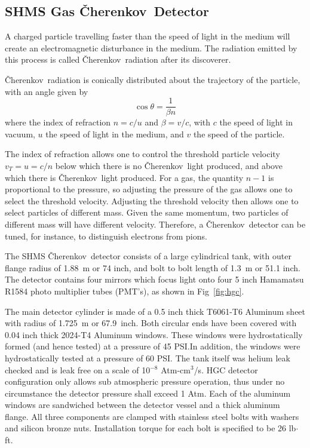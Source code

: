 \documentclass[12pt]{article}
\newcommand{\Cerenkov}{\v{C}herenkov~}
\begin{document}
\subsection{SHMS Gas \Cerenkov Detector}

A charged particle travelling faster
than the speed of light in the medium will create an electromagnetic
disturbance in the medium. The radiation emitted by this process is
called \Cerenkov radiation after its discoverer.

\Cerenkov radiation is conically distributed about the trajectory of the
particle, with an angle given by
$$
	\cos{\theta} = \frac{1}{\beta n}
$$
where the index of refraction $n = c/u$ and $\beta = v/c$, with $c$
the speed of light in vacuum, $u$ the speed of light in the medium,
and $v$ the speed of the particle.

The index of refraction allows one to control the threshold particle velocity 
$v_{T}=u=c/n$ below which there is no \Cerenkov light produced, and above which there 
is \Cerenkov light produced.  For a gas, the quantity $n-1$ is proportional to the pressure, 
so adjusting the pressure of the gas allows one to select the
threshold velocity. Adjusting the threshold velocity then allows one to select particles of
different mass.  Given the same momentum, two particles of different mass
will have different velocity.  Therefore, a \Cerenkov detector can be tuned,
for instance, to distinguish electrons from pions.



The SHMS \Cerenkov detector consists of a large cylindrical tank, with outer flange radius of 1.88~m or 74 inch, and bolt to bolt length of 1.3~m or 51.1 inch. The detector contains four mirrors which focus light onto four 5 inch Hamamatsu R1584 photo multiplier tubes (PMT's), as shown in Fig~\ref{fig:hgc}.


The main detector cylinder is made of a 0.5 inch thick T6061-T6 Aluminum sheet with radius of 1.725~m or 67.9~inch. Both circular ends have been covered with 0.04 inch thick 2024-T4 Aluminum windows. These windows were hydrostatically formed (and hence tested) at a pressure of 45 PSI.In addition, the windows were hydrostatically tested at a pressure of 60 PSI. The tank itself was helium leak checked and is leak free on a scale of 10$^{-8}$ Atm-cm$^3$/s. HGC detector configuration only allows sub atmospheric pressure operation, thus under no circumstance the detector pressure shall exceed 1 Atm. Each of the aluminum windows are sandwiched between the detector vessel and a thick aluminum flange. All three components are clamped with stainless steel bolts with washers and silicon bronze nuts. Installation torque for each bolt is specified to be 26 lb$\cdot$ft. 
\end{document}
